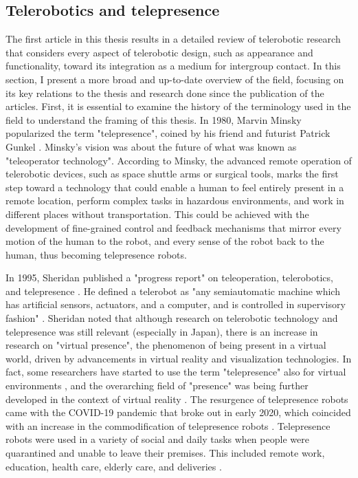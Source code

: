 \documentclass[dissertation,math,vertlayout,pdfa,colorlinks]{aaltoseries}
\begin{document}
\subsection{Telerobotics and telepresence}
The first article in this thesis results in a detailed review of telerobotic research that considers every aspect of telerobotic design, such as appearance and functionality, toward its integration as a medium for intergroup contact. In this section, I present a more broad and up-to-date overview of the field, focusing on its key relations to the thesis and research done since the publication of the articles. First, it is essential to examine the history of the terminology used in the field to understand the framing of this thesis. In 1980, Marvin Minsky popularized the term "telepresence", coined by his friend and futurist Patrick Gunkel \cite{minskyTelepresence1980}. Minsky's vision was about the future of what was known as "teleoperator technology". According to Minsky, the advanced remote operation of telerobotic devices, such as space shuttle arms or surgical tools, marks the first step toward a technology that could enable a human to feel entirely present in a remote location, perform complex tasks in hazardous environments, and work in different places without transportation. This could be achieved with the development of fine-grained control and feedback mechanisms that mirror every motion of the human to the robot, and every sense of the robot back to the human, thus becoming telepresence robots.

In 1995, Sheridan published a "progress report" on teleoperation, telerobotics, and telepresence \cite{sheridanTeleoperationTeleroboticsTelepresence1995}. He defined a telerobot as "any semiautomatic machine which has artificial sensors, actuators, and a computer, and is controlled in supervisory fashion" \cite[p. 205]{sheridanTeleoperationTeleroboticsTelepresence1995}. Sheridan noted that although research on telerobotic technology and telepresence was still relevant (especially in Japan), there is an increase in research on "virtual presence", the phenomenon of being present in a virtual world, driven by advancements in virtual reality and visualization technologies. In fact, some researchers have started to use the term "telepresence" also for virtual environments \cite{steuerDefiningVirtualReality1992}, and the overarching field of "presence" was being further developed in the context of virtual reality \cite{slaterInfluenceBodyMovement1998}. The resurgence of telepresence robots came with the COVID-19 pandemic that broke out in early 2020, which coincided with an increase in the commodification of telepresence robots \cite{shenRobotsCOVID19Pandemic2021}. Telepresence robots were used in a variety of social and daily tasks when people were quarantined and unable to leave their premises. This included remote work, education, health care, elderly care, and deliveries \cite{shenRobotsCOVID19Pandemic2021}. 
\end{document}
